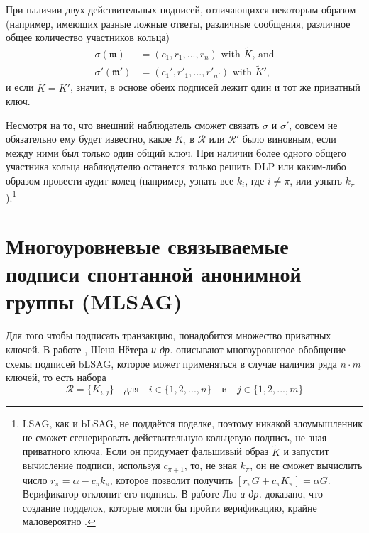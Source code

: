 При наличии двух действительных подписей, отличающихся некоторым образом (например, имеющих разные ложные ответы, различные сообщения, различное общее количество участни\-ков кольца)\vspace{.1cm}
\begin{align*}
	\sigma(\mathfrak{m})   &= (c_1, r_1, ..., r_n)\textrm{ with } \tilde{K}\textrm{, and}\\
	\sigma'(\mathfrak{m}')  &= (c_1', r'_1, ..., r'_{n'})\textrm{ with } \tilde{K}'\textrm{,}
\end{align*}
\quad и если \(\tilde{K} =  \tilde{K}'\), значит, в основе обеих подписей лежит один и тот же приватный ключ.%

Несмотря на то, что внешний наблюдатель сможет связать $\sigma$ и $\sigma'$, совсем не обязательно ему будет известно, какое $K_i$ в $\mathcal{R}$ или $\mathcal{R}'$ было виновным, если между ними был только один общий ключ. При наличии более одного общего участника кольца наблюдателю останется только решить DLP или каким-либо образом провести аудит колец (например, узнать все $k_i$, где $i \neq \pi$, или узнать $k_\pi$).\footnote{\label{lsag_unforgeable_note}LSAG, как и bLSAG, не поддаётся поделке, поэтому никакой злоумышленник не сможет сгенерировать действительную кольцевую подпись, не зная приватного ключа. Если он придумает фальшивый образ $\tilde{K}$ и запустит вычисление подписи, используя $c_{\pi+1}$, то, не зная $k_\pi$, он не сможет вычислить число $r_\pi = \alpha - c_\pi k_\pi$, которое позволит получить $[r_\pi G + c_\pi K_\pi] = \alpha G$. Верификатор отклонит его подпись. В работе Лю {\em и др.} доказано, что создание подделок, которые могли бы пройти верификацию, крайне маловероятно \cite{Liu2004}.}



\section{Многоуровневые связываемые подписи спонтанной аноним\-ной группы (MLSAG)}
\label{sec:MLSAG}

Для того чтобы подписать транзакцию, понадобится множество приватных ключей. В работе \cite{MRL-0005-ringct}, Шена Нётера {\em и др.} описывают многоуровневое обобщение схемы подписей bLSAG, которое может применяться в случае наличия ряда \(n \cdot m\) ключей, то есть набора\vspace{.175cm}
\[\mathcal{R} = \{K_{i,j}\}  \quad \textrm{для} \quad  i \in \{1, 2, ..., n\} \quad \textrm{и} \quad j \in \{1, 2, ..., m\}\]

